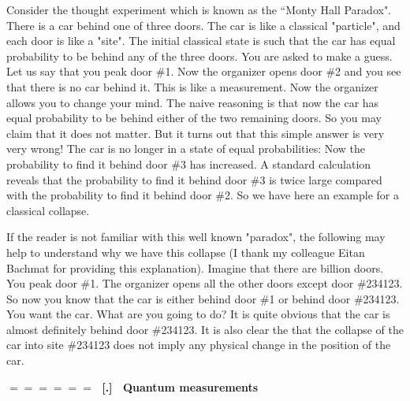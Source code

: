 \documentclass[onecolumn,fleqn]{revtex4}
\renewcommand{\thesubsection}{\arabic{subsection}}
\renewcommand{\thesubsubsection}{\arabic{subsubsection}}
\newcommand{\sheadC}[1]
{
\addtocounter{subsubsection}{1}
\vspace{5mm}
{\Large\bf $=\!=\!=\!=\!=\!=\;$ [\thesubsection.\thesubsubsection] \ #1}  
\nopagebreak
\phantomsection
}
\begin{document}
Consider the thought experiment 
which is known as the ``Monty Hall Paradox".
There is a car behind one of three doors. 
The car is like a classical "particle", 
and each door is like a "site". 
The initial classical state is such that 
the car has equal probability to be behind 
any of the three doors. You are asked to make a guess.
Let us say that you peak door \#1. Now the organizer 
opens door \#2 and you see that there is no car behind it. 
This is like a measurement. Now the organizer allows 
you to change your mind. The naive reasoning is that 
now the car has equal probability to be behind either 
of the two remaining doors. So you may claim that 
it does not matter. But it turns out that this simple 
answer is very very wrong! The car is no longer 
in a state of equal probabilities: Now the probability 
to find it behind door \#3 has increased. A standard   
calculation reveals that the probability to find 
it behind door \#3 is twice large compared with 
the probability to find it behind door \#2.
So we have here an example for a classical collapse. 

If the reader is not familiar with this well known "paradox", 
the following may help to understand why we have this 
collapse (I thank my colleague Eitan Bachmat for providing 
this explanation).  Imagine that there are billion doors. 
You peak door \#1. The organizer opens all the other doors 
except door \#234123. So now you know that the 
car is either behind door \#1 or behind door \#234123. 
You want the car. What are you going to do?    
It is quite obvious that the car is almost definitely 
behind door \#234123. It is also clear the that 
the collapse of the car into site \#234123 does not 
imply any physical change in the position of the car. 


\sheadC{Quantum measurements}
\end{document}
